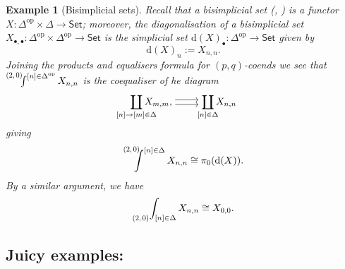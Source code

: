 \documentclass[11pt]{amsart}
\def\defeq{:=}
\newcommand*{\Scale}[2][4]{\scalebox{#1}{\ensuremath{#2}}}%
\newcommand{\pqEnd}[3]{\mathop{\prescript{}{\Scale[.75]{\raisebox{.25em}{$(#1,#2)$}}}{\int_{#3}}}}
\newcommand{\pqCoend}[3]{%
  \mathchoice
    {\mathop{\prescript{\Scale[.75]{\raisebox{-.25em}{$(#1,#2)$}}\kern-.625em}{}{\int^{#3}}}}
    {\mathop{\prescript{\Scale[.75]{\raisebox{-.25em}{$(#1,#2)$}}\kern-.25em}{}{\int^{#3}}}}
    {\mathop{\prescript{\Scale[.75]{\raisebox{-.25em}{$(#1,#2)$}}\kern-.25em}{}{\int^{#3}}}}
    {\mathop{\prescript{\Scale[.75]{\raisebox{-.25em}{$(#1,#2)$}}\kern-.25em}{}{\int^{#3}}}}
  }
\newtheorem{example}{Example}
\def\op{\text{op}}
\begin{document}
\begin{example}[Bisimplicial sets]
	Recall that a \emph{bisimplicial set} (\cite[Chapter IV]{goerss-jardine}, \cite[\S 3.1.15]{cisinski-model-categories}) is a functor $X : \Delta^\op\times \Delta \to \textsf{Set}$; moreover, the \emph{diagonalisation} of a bisimplicial set $X_{\bullet,\bullet}\colon\Delta^\op\times\Delta^\op\longrightarrow\textsf{Set}$ is the simplicial set $\text{d}(X)_{\bullet}\colon\Delta^\op\longrightarrow\textsf{Set}$ given by
	\[\text{d}(X)_{n}\defeq X_{n,n}.\]
	Joining the products and equalisers formula for $(p,q)$-coends we  see that $\pqCoend{2}{0}{[n]\in\Delta^\op}X_{n,n}$ is the coequaliser of he diagram
	\[
		\begin{tikzcd}[cramped,ampersand replacement=\&]
			\displaystyle\coprod_{\mathclap{[n]\to[m]\in\Delta}}X_{m,m},
			\arrow[r,shift left =1.0]
			\arrow[r,shift right=1.0]
			\&
			\displaystyle\coprod_{\mathclap{[n]\in\Delta}}X_{n,n}
		\end{tikzcd}
	\]
	giving
	\[\pqCoend{2}{0}{[n]\in\Delta}X_{n,n}\cong\pi_{0}(\text{d}(X)).\]
	By a similar argument, we have
	\[\pqEnd{2}{0}{[n]\in\Delta}X_{n,n}\cong X_{0,0}.\]
\end{example}
\label{sec:orgc0066fa}
\subsection{Juicy examples:}
\end{document}
